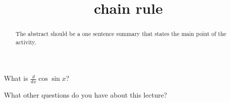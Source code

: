 \documentclass{ximera}
\title{chain rule}
\begin{document}
\begin{abstract}
  The abstract should be a one sentence summary that states the main point of the activity.
\end{abstract}

\maketitle

\begin{question}
  What is $\frac{d}{dx} \cos \sin x$?

  \begin{solution}
    \begin{multiple-choice}
    \end{multiple-choice}  
  \end{solution}
\end{question}

What other questions do you have about this lecture?
\begin{free-response}
\end{free-response}
\end{document}

